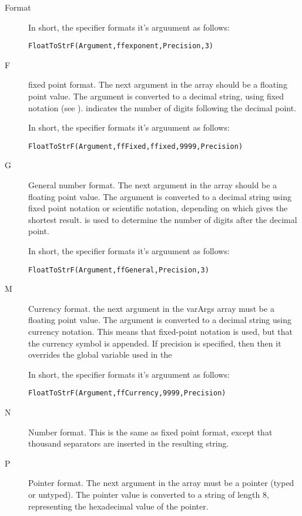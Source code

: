 \begin{function}{Format}
\begin{description}
In short, the  specifier formats it's arguument as follows:
\begin{verbatim}
FloatToStrF(Argument,ffexponent,Precision,3)
\end{verbatim}

\item[F] fixed point format. The next argument in the  array
should be a floating point value. The argument is converted to a 
decimal string, using fixed notation (see ). 
 indicates the number of digits following the 
decimal point.

In short, the  specifier formats it's arguument as follows:
\begin{verbatim}
FloatToStrF(Argument,ffFixed,ffixed,9999,Precision)
\end{verbatim}

\item[G] General number format. The next argument in the  array 
should be a floating point value. The argument is converted to a decimal
string using fixed point notation or scientific notation, depending on which
gives the shortest result.  is used to determine the number
of digits after the decimal point.

In short, the  specifier formats it's arguument as follows:
\begin{verbatim}
FloatToStrF(Argument,ffGeneral,Precision,3)
\end{verbatim}

\item[M] Currency format. the next argument in the var{Args} array must 
be a floating point value. The argument is converted to a decimal string
using currency notation. This means that fixed-point notation is used, but 
that the currency symbol is appended. If precision is specified, then 
then it overrides the  global variable used in the 

In short, the  specifier formats it's arguument as follows:
\begin{verbatim}
FloatToStrF(Argument,ffCurrency,9999,Precision)
\end{verbatim}

\item[N] Number format. This is the same as fixed point format, except that
thousand separators are inserted in the resulting string.

\item[P] Pointer format. The next argument in the  array must be a
pointer (typed or untyped). The pointer value is converted to a string of
length 8, representing the hexadecimal value of the pointer. 


\end{description}
\end{function}

